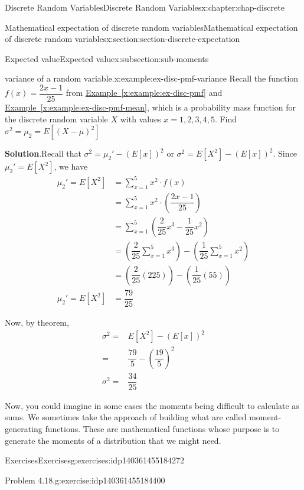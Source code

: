 \documentclass[oneside,10pt,]{book}
\newcommand{\blocktitlefont}{\relax}
\newcommand{\xreffont}{\relax}
\numberwithin{equation}{section}
\newcommand{\amp}{&}
\begin{document}
\begin{chapterptx}{Discrete Random Variables}{}{Discrete Random Variables}{}{}{x:chapter:chap-discrete}
\begin{sectionptx}{Mathematical expectation of discrete random variables}{}{Mathematical expectation of discrete random variables}{}{}{x:section:section-discrete-expectation}
\begin{subsectionptx}{Expected value}{}{Expected value}{}{}{x:subsection:sub-moments}
\begin{example}{variance of a random variable.}{x:example:ex-disc-pmf-variance}
Recall the function \(f(x) = \dfrac{2x-1}{25}\) from \hyperref[x:example:ex-disc-pmf]{Example~{\xreffont\ref{x:example:ex-disc-pmf}}} and \hyperref[x:example:ex-disc-pmf-mean]{Example~{\xreffont\ref{x:example:ex-disc-pmf-mean}}}, which is a probability mass function for the discrete random variable \(X\) with values \(x=1,2,3,4,5\).  Find \(\sigma^2 = \mu_{2} = E[(X - \mu)^2]\)%
\par\smallskip%
\noindent\textbf{\blocktitlefont Solution}.\hypertarget{g:solution:idp140361455176096}{}\quad{}Recall that \(\sigma^2 = \mu_{2}' - \left(E[x]\right)^2\) or \(\sigma^2 = E[X^2] - \left(E[x]\right)^2\). Since \(\mu_{2}' = E[X^2]\), we have%
\begin{align*}
\mu_{2}' = E[X^2] \amp = \sum\limits_{x=1}^5 x^2\cdot f(x)\\
\amp = \sum\limits_{x=1}^5 x^2\cdot \left(\dfrac{2x-1}{25}\right)\\
\amp = \sum\limits_{x=1}^5 \left(\dfrac{2}{25}x^3 - \dfrac{1}{25}x^2\right)\\
\amp = \left(\dfrac{2}{25}\sum\limits_{x=1}^5 x^3\right) - \left(\dfrac{1}{25}\sum\limits_{x=1}^5 x^2\right)\\
\amp = \left(\dfrac{2}{25}\left(225\right)\right) - \left(\dfrac{1}{25}\left(55\right)\right)\\
\mu_{2}' = E[X^2] \amp = \dfrac{79}{25}
\end{align*}
%
\par
Now, by theorem,%
\begin{align*}
\sigma^2 = \amp E[X^2] - \left(E[x]\right)^2\\
= \amp \dfrac{79}{5} - \left(\dfrac{19}{5}\right)^2\\
\sigma^2 = \amp  \dfrac{34}{25}
\end{align*}
%
\end{example}
Now, you could imagine in some cases the moments being difficult to calculate as sums. We sometimes take the approach of building what are called moment-generating functions. These are mathematical functions whose purpose is to generate the moments of a distribution that we might need.%
\end{subsectionptx}
%
%
\typeout{************************************************}
\typeout{************************************************}
%
\begin{exercises-subsection}{Exercises}{}{Exercises}{}{}{g:exercises:idp140361455184272}
\begin{divisionexercise}{1}{Problem 4.18.}{}{g:exercise:idp140361455184400}%

\end{divisionexercise}
\end{exercises-subsection}
\end{sectionptx}
\end{chapterptx}
\end{document}
